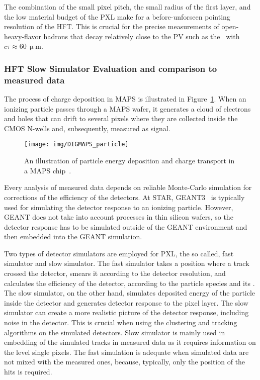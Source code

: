 The combination of the small pixel pitch, the small radius of the first layer, and the low material budget of the PXL make for a before-unforseen pointing resolution of the HFT\@. This is crucial for the precise measurements of open-heavy-flavor hadrons that decay relatively close to the PV such as the \Lambdac\ with $c\tau\approx 60 \,\upmu$m. 

\subsubsection{HFT Slow Simulator Evaluation and comparison to measured data}
The process of charge deposition in MAPS is illustrated in Figure~\ref{DigmapsIllustration}\@.
When an ionizing particle passes through a MAPS wafer, it generates a cloud of electrons and holes that can drift to several pixels where they are collected inside the CMOS N-wells and, subsequently, measured as signal.  

\begin{figure}[!htb]
\begin{center}
 \texttt{[image: img/DIGMAPS\_particle]}\\
\end{center}
\caption[An illustration of particle energy deposition and charge transport in a MAPS chip.]{\label{DigmapsIllustration}An illustration of particle energy deposition and charge transport in a MAPS chip~\cite{DIGMAPS}.}
\end{figure}

Every analysis of measured data depends on reliable Monte-Carlo simulation for corrections of the efficiency of the detectors. At STAR, GEANT3~\cite{GEANT} is typically used for simulating the detector response to an ionizing particle. However, GEANT does not take into account processes in thin silicon wafers, so the detector response has to be simulated outside of the GEANT environment and then embedded into the GEANT simulation. 

Two types of detector simulators are employed for PXL, the so called, fast simulator and slow simulator. The fast simulator takes a position where a track crossed the detector, smears it according to the detector resolution, and calculates the efficiency of the detector, according to the particle species and its \pt\@. The slow simulator, on the other hand, simulates deposited energy of the particle inside the detector and generates detector response to the pixel layer. The slow simulator can create a more realistic picture of the detector response, including noise in the detector. This is crucial when using the clustering and tracking algorithms on the simulated detectors. Slow simulator is mainly used in embedding of the simulated tracks in measured data as it requires information on the level single pixels. The fast simulation is adequate when simulated data are not mixed with the measured ones, because, typically, only the position of the hits is required.

